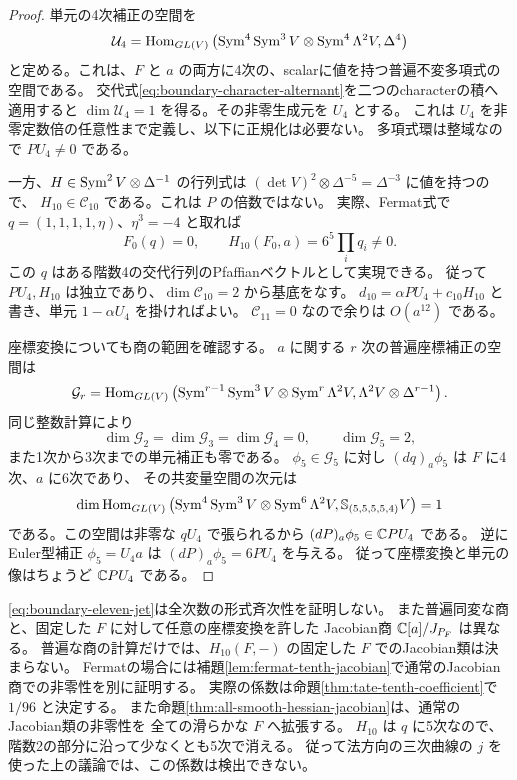 \begin{proof}
単元の4次補正の空間を
\[
 \mathcal U_4=
 \operatorname{Hom}_{GL(V)}\left(
 \operatorname{Sym}^4\operatorname{Sym}^3V\otimes\operatorname{Sym}^4\Lambda^2V,\Delta^4\right)
\]
と定める。これは、$F$ と $a$ の両方に4次の、scalarに値を持つ普遍不変多項式の空間である。
交代式\eqref{eq:boundary-character-alternant}を二つのcharacterの積へ適用すると
$\dim\mathcal U_4=1$ を得る。その非零生成元を $U_4$ とする。
これは $U_4$ を非零定数倍の任意性まで定義し、以下に正規化は必要ない。
多項式環は整域なので $P U_4\ne0$ である。

一方、$H\in\operatorname{Sym}^2V\otimes\Delta^{-1}$ の行列式は
$(\det V)^2\otimes\Delta^{-5}=\Delta^{-3}$ に値を持つので、
$H_{10}\in\mathcal C_{10}$ である。これは $P$ の倍数ではない。
実際、Fermat式で $q=(1,1,1,1,\eta)$、$\eta^3=-4$ と取れば
\[
                 F_0(q)=0,\qquad
                 H_{10}(F_0,a)=6^5\prod_iq_i\ne0.
\]
この $q$ はある階数4の交代行列のPfaffianベクトルとして実現できる。
従って $P U_4,H_{10}$ は独立であり、$\dim\mathcal C_{10}=2$ から基底をなす。
$d_{10}=\alpha P U_4+c_{10}H_{10}$ と書き、単元 $1-\alpha U_4$ を掛ければよい。
$\mathcal C_{11}=0$ なので余りは $O(a^{12})$ である。

座標変換についても商の範囲を確認する。
$a$ に関する $r$ 次の普遍座標補正の空間は
\[
 \mathcal G_r=
 \operatorname{Hom}_{GL(V)}\left(
 \operatorname{Sym}^{r-1}\operatorname{Sym}^3V\otimes\operatorname{Sym}^r\Lambda^2V,
 \Lambda^2V\otimes\Delta^{r-1}\right).
\]
同じ整数計算により
\[
 \dim\mathcal G_2=\dim\mathcal G_3=\dim\mathcal G_4=0,
 \qquad \dim\mathcal G_5=2,
\]
また1次から3次までの単元補正も零である。
$\phi_5\in\mathcal G_5$ に対し $(dq)_a\phi_5$ は $F$ に4次、$a$ に6次であり、
その共変量空間の次元は
\[
 \dim\operatorname{Hom}_{GL(V)}\left(
 \operatorname{Sym}^4\operatorname{Sym}^3V\otimes\operatorname{Sym}^6\Lambda^2V,
 \mathbb S_{(5,5,5,5,4)}V\right)=1
\]
である。この空間は非零な $qU_4$ で張られるから
$(dP)_a\phi_5\in\mathbb C P U_4$ である。
逆にEuler型補正 $\phi_5=U_4a$ は $(dP)_a\phi_5=6P U_4$ を与える。
従って座標変換と単元の像はちょうど $\mathbb C P U_4$ である。
\end{proof}

\begin{remark}[標準形の適用範囲]\label{rem:boundary-jet-scope}
\eqref{eq:boundary-eleven-jet}は全次数の形式斉次性を証明しない。
また普遍同変な商と、固定した $F$ に対して任意の座標変換を許した
Jacobian商 $\mathbb C[a]/J_{P_F}$ は異なる。
普遍な商の計算だけでは、$H_{10}(F,-)$ の固定した $F$ でのJacobian類は決まらない。
Fermatの場合には補題\ref{lem:fermat-tenth-jacobian}で通常のJacobian商での非零性を別に証明する。
実際の係数は命題\ref{thm:tate-tenth-coefficient}で $1/96$ と決定する。
また命題\ref{thm:all-smooth-hessian-jacobian}は、通常のJacobian類の非零性を
全ての滑らかな $F$ へ拡張する。
$H_{10}$ は $q$ に5次なので、階数2の部分に沿って少なくとも5次で消える。
従って法方向の三次曲線の $j$ を使った上の議論では、この係数は検出できない。
\end{remark}


